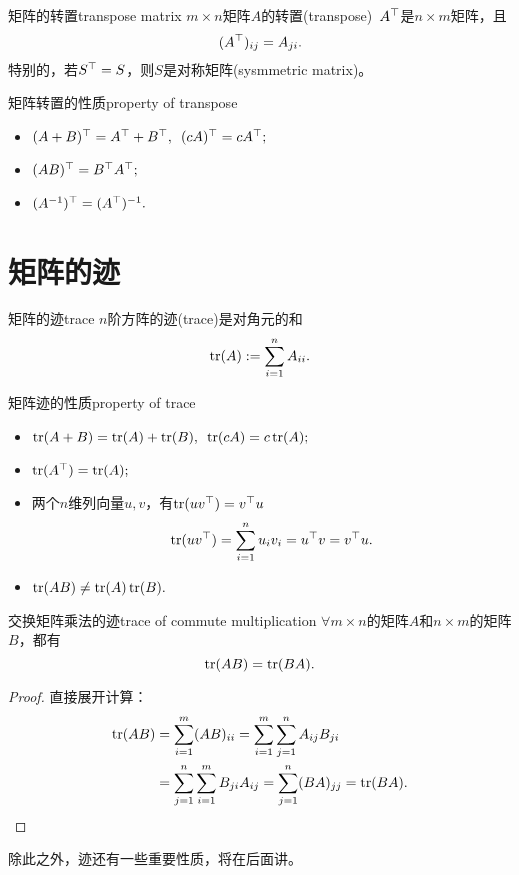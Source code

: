\begin{definition}{矩阵的转置}{transpose matrix}
	$m\times n$矩阵$A$的转置(transpose)~$A^\top$是$n\times m$矩阵，且 
	\[
		(A^\top)_{ij}=A_{ji}.
	\]
	特别的，若$S^\top=S$，则$S$是对称矩阵(sysmmetric matrix)。
\end{definition}
\begin{theorem}{矩阵转置的性质}{property of transpose}
    \begin{itemize}
    	\item $(A+B)^\top=A^\top+B^\top,\enspace (cA)^\top=cA^\top;$
    	\item $(AB)^\top=B^\top A^\top;$
    	\item $(A^{-1})^\top=(A^\top)^{-1}.$
    \end{itemize}
\end{theorem}
\section{矩阵的迹}
\begin{definition}{矩阵的迹}{trace}
	$n$阶方阵的迹(trace)是对角元的和
	\begin{equation}
		\operatorname{tr}(A):=\sum_{i=1}^nA_{ii}.
	\end{equation}
\end{definition}
\begin{theorem}{矩阵迹的性质}{property of trace}
    \begin{itemize}
    	\item $\operatorname{tr}(A+B)=\operatorname{tr}(A)+\operatorname{tr}(B),\enspace \operatorname{tr}(cA)=c\operatorname{tr}(A);$
    	\item $\operatorname{tr}(A^\top)=\operatorname{tr}(A);$
    	\item 两个$n$维列向量$u,v$，有$\operatorname{tr}(uv^\top)=v^\top u$
    	\[
    		\operatorname{tr}(uv^\top)=\sum_{i=1}^nu_iv_i=u^\top v=v^\top u.
    	\]
    	\item $\operatorname{tr}(AB)\neq\operatorname{tr}(A)\operatorname{tr}(B).$
    \end{itemize}
\end{theorem}
\begin{theorem}{交换矩阵乘法的迹}{trace of commute multiplication}
	$\forall m\times n$的矩阵$A$和$n\times m$的矩阵$B$，都有
	\begin{equation}
		\operatorname{tr}(AB)=\operatorname{tr}(BA).
	\end{equation}
\end{theorem}
\begin{proof}
	直接展开计算：
	\begin{align*}
		\operatorname{tr}(AB)&=\sum_{i=1}^m(AB)_{ii}=\sum_{i=1}^m\sum_{j=1}^nA_{ij}B_{ji}\\
		&=\sum_{j=1}^n\sum_{i=1}^mB_{ji}A_{ij}=\sum_{j=1}^n(BA)_{jj}=\operatorname{tr}(BA).
		\qedhere
	\end{align*}
\end{proof}
除此之外，迹还有一些重要性质，将在后面讲。